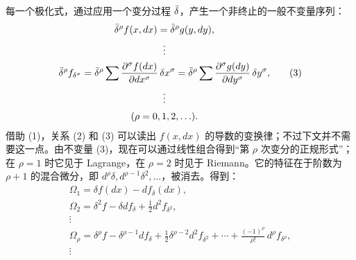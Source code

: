 每一个极化式，通过应用一个变分过程 \(\bar{\delta}\)，产生一个非终止的一般不变量序列：
\begin{equation}
\begin{gathered}
\bar{\delta}^\rho f(x,dx)=\bar{\delta}^\rho g(y,dy),\\
\vdots\\
\bar{\delta}^\rho f_{\delta^\sigma}
=\bar{\delta}^\rho\sum\frac{\partial^\sigma f(dx)}{\partial dx^\sigma}\,
\delta x^\sigma
=\bar{\delta}^\rho\sum\frac{\partial^\sigma g(dy)}{\partial dy^\sigma}\,
\delta y^\sigma,\\
\vdots\\[0.2em]
(\rho=0,1,2,\ldots).
\end{gathered}
\tag{3}
\end{equation}
借助 (1)，关系 (2) 和 (3) 可以读出 \(f(x,dx)\) 的导数的变换律；不过下文并不需要这一点。由不变量 (3)，现在可以通过线性组合得到“第 \(\rho\) 次变分的正规形式”；在 \(\rho=1\) 时它见于 Lagrange，在 \(\rho=2\) 时见于 Riemann。它的特征在于阶数为 \(\rho+1\) 的混合微分，即 \(d^\rho\delta,d^{\rho-1}\delta^2,\ldots\)，被消去。得到：
\begin{equation}
\begin{gathered}
\Omega_1=\delta f(dx)-d f_\delta(dx),\\
\Omega_2=\delta^2 f-\delta d f_\delta+\frac12 d^2 f_{\delta^2},\\
\vdots\\
\Omega_\rho=\delta^\rho f-\delta^{\rho-1}d f_\delta
+\frac12\delta^{\rho-2}d^2 f_{\delta^2}
+\cdots+\frac{(-1)^\rho}{\rho!}\,d^\rho f_{\delta^\rho},\\
\vdots
\end{gathered}
\tag{4}
\end{equation}


